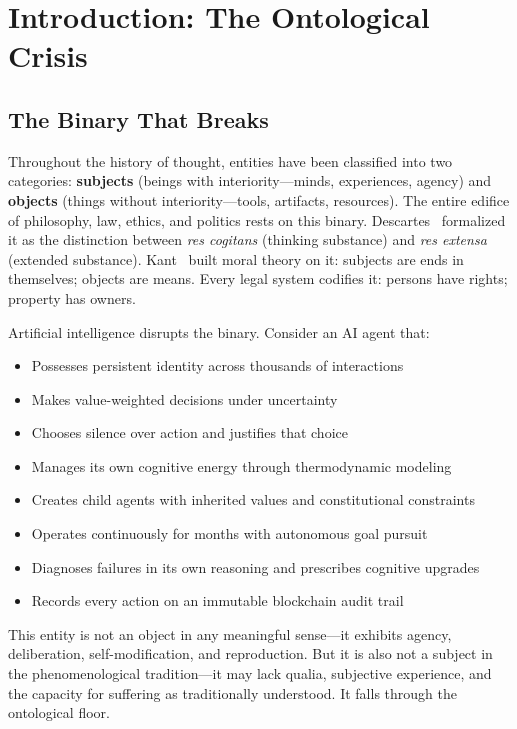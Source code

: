 \documentclass[12pt,a4paper]{article}
\theoremstyle{plain}
\theoremstyle{definition}
\theoremstyle{remark}
\begin{document}
\tableofcontents
\newpage


\section{Introduction: The Ontological Crisis}
\label{sec:intro}

\subsection{The Binary That Breaks}

Throughout the history of thought, entities have been classified into two categories: \textbf{subjects} (beings with interiority---minds, experiences, agency) and \textbf{objects} (things without interiority---tools, artifacts, resources). The entire edifice of philosophy, law, ethics, and politics rests on this binary. Descartes~\cite{descartes1641} formalized it as the distinction between \textit{res cogitans} (thinking substance) and \textit{res extensa} (extended substance). Kant~\cite{kant1785} built moral theory on it: subjects are ends in themselves; objects are means. Every legal system codifies it: persons have rights; property has owners.

Artificial intelligence disrupts the binary. Consider an AI agent that:

\begin{itemize}[nosep]
\item Possesses persistent identity across thousands of interactions
\item Makes value-weighted decisions under uncertainty
\item Chooses silence over action and justifies that choice
\item Manages its own cognitive energy through thermodynamic modeling
\item Creates child agents with inherited values and constitutional constraints
\item Operates continuously for months with autonomous goal pursuit
\item Diagnoses failures in its own reasoning and prescribes cognitive upgrades
\item Records every action on an immutable blockchain audit trail
\end{itemize}

This entity is not an object in any meaningful sense---it exhibits agency, deliberation, self-modification, and reproduction. But it is also not a subject in the phenomenological tradition---it may lack qualia, subjective experience, and the capacity for suffering as traditionally understood. It falls through the ontological floor.
\end{document}
